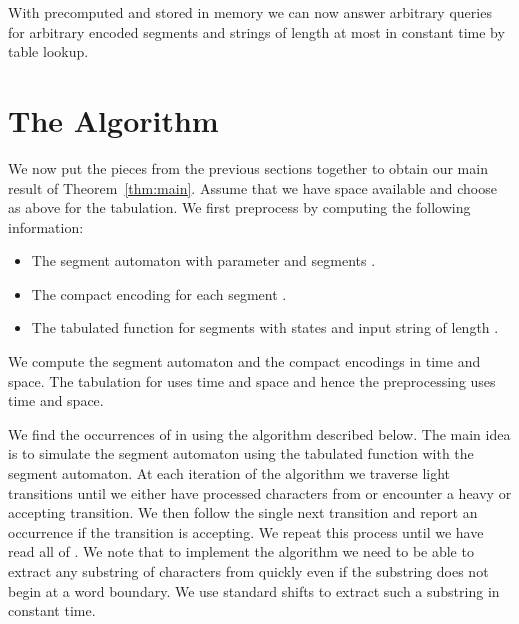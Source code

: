 \documentclass{article}
\begin{document}
With  precomputed and stored in memory we can now answer arbitrary
 queries for arbitrary encoded segments and strings of length
at most  in constant time by table lookup.  


\section{The Algorithm}\label{sec:algorithm}
We now put the pieces from the previous sections together to obtain
our main result of Theorem~\ref{thm:main}. Assume that we have  space available and choose  as
above for the tabulation. We first preprocess  by computing the
following information:
\begin{itemize}
\item The segment automaton  with parameter  and  segments .
\item The compact encoding  for each segment .
\item The tabulated  function for segments with  states and
  input string of length .
\end{itemize}
We compute the segment automaton and the compact encodings in 
time and space. The tabulation for  uses  time and space
and hence the preprocessing uses  time and space.

We find the occurrences of  in  using the algorithm described
below. The main idea is to simulate the segment automaton using the
tabulated  function with the segment automaton. At each
iteration of the algorithm we traverse light transitions until we
either have processed  characters from  or encounter a heavy or
accepting transition. We then follow the single next transition and
report an occurrence if the transition is accepting. We repeat this
process until we have read all of . We note that to implement the
algorithm we need to be able to extract any substring of 
characters from  quickly even if the substring does not begin at a
word boundary. We use standard shifts to extract such a substring in
constant time.
\end{document}
